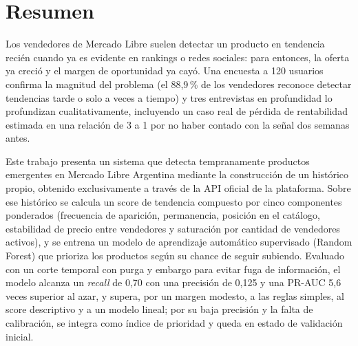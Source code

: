 \chapter*{Resumen}









\noindent
Los vendedores de Mercado Libre suelen detectar un producto en tendencia recién cuando ya es evidente en rankings o redes sociales: para entonces, la oferta ya creció y el margen de oportunidad ya cayó. Una encuesta a 120 usuarios confirma la magnitud del problema (el 88,9\,\% de los vendedores reconoce detectar tendencias tarde o solo a veces a tiempo) y tres entrevistas en profundidad lo profundizan cualitativamente, incluyendo un caso real de pérdida de rentabilidad estimada en una relación de 3 a 1 por no haber contado con la señal dos semanas antes.

Este trabajo presenta un sistema que detecta tempranamente productos emergentes en Mercado Libre Argentina mediante la construcción de un histórico propio, obtenido exclusivamente a través de la API oficial de la plataforma. Sobre ese histórico se calcula un score de tendencia compuesto por cinco componentes ponderados (frecuencia de aparición, permanencia, posición en el catálogo, estabilidad de precio entre vendedores y saturación por cantidad de vendedores activos), y se entrena un modelo de aprendizaje automático supervisado (Random Forest) que prioriza los productos según su chance de seguir subiendo. Evaluado con un corte temporal con purga y embargo para evitar fuga de información, el modelo alcanza un \emph{recall} de 0,70 con una precisión de 0,125 y una PR-AUC 5,6 veces superior al azar, y supera, por un margen modesto, a las reglas simples, al score descriptivo y a un modelo lineal; por su baja precisión y la falta de calibración, se integra como índice de prioridad y queda en estado de validación inicial.

